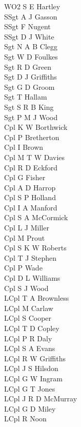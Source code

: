 \begin{multicols}{2}
  \noindent
  WO2 S E Hartley \\
  SSgt A J Gasson \\
  SSgt F Nugent \\
  SSgt D J White \\
  Sgt N A B Clegg \\
  Sgt W D Foulkes \\
  Sgt R D Green \\
  Sgt D J Griffiths \\
  Sgt G D Groom \\
  Sgt T Hallam \\
  Sgt S R B King \\
  Sgt P M J Wood \\
  Cpl K W Borthwick \\
  Cpl P Bretherton \\
  Cpl I Brown \\
  Cpl M T W Davies \\
  Cpl R D Eckford \\
  Cpl G Fisher \\
  Cpl A D Harrop \\
  Cpl S P Holland \\
  Cpl I A Manford \\
  Cpl S A McCormick \\
  Cpl L J Miller \\
  Cpl M Prout \\
  Cpl S K W Roberts \\
  Cpl T J Stephen \\
  Cpl P Wade \\
  Cpl D L Williams \\
  Cpl S J Wood \\
  LCpl T A Brownless \\
  LCpl M Carlaw \\
  LCpl S Cooper \\
  LCpl T D Copley \\
  LCpl P R Daly \\
  LCpl S A Evans \\
  LCpl R W Griffiths \\
  LCpl J S Hilsdon \\
  LCpl G W Ingram \\
  LCpl G T Jones \\
  LCpl J R D McMurray \\
  LCpl G D Miley \\
  LCpl R Noon \\

\end{multicols}
